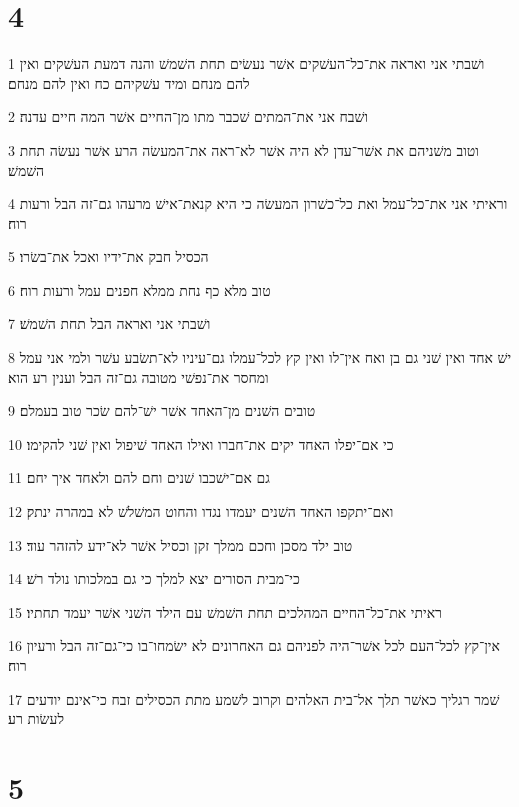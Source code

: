 \chapter{4}

\par 1 ושׁבתי אני ואראה את־כל־העשׁקים אשׁר נעשׂים תחת השׁמשׁ והנה דמעת העשׁקים ואין להם מנחם ומיד עשׁקיהם כח ואין להם מנחם׃
\par 2 ושׁבח אני את־המתים שׁכבר מתו מן־החיים אשׁר המה חיים עדנה׃
\par 3 וטוב משׁניהם את אשׁר־עדן לא היה אשׁר לא־ראה את־המעשׂה הרע אשׁר נעשׂה תחת השׁמשׁ׃
\par 4 וראיתי אני את־כל־עמל ואת כל־כשׁרון המעשׂה כי היא קנאת־אישׁ מרעהו גם־זה הבל ורעות רוח׃
\par 5 הכסיל חבק את־ידיו ואכל את־בשׂרו׃
\par 6 טוב מלא כף נחת ממלא חפנים עמל ורעות רוח׃
\par 7 ושׁבתי אני ואראה הבל תחת השׁמשׁ׃
\par 8 ישׁ אחד ואין שׁני גם בן ואח אין־לו ואין קץ לכל־עמלו גם־עיניו לא־תשׂבע עשׁר ולמי אני עמל ומחסר את־נפשׁי מטובה גם־זה הבל וענין רע הוא׃
\par 9 טובים השׁנים מן־האחד אשׁר ישׁ־להם שׂכר טוב בעמלם׃
\par 10 כי אם־יפלו האחד יקים את־חברו ואילו האחד שׁיפול ואין שׁני להקימו׃
\par 11 גם אם־ישׁכבו שׁנים וחם להם ולאחד איך יחם׃
\par 12 ואם־יתקפו האחד השׁנים יעמדו נגדו והחוט המשׁלשׁ לא במהרה ינתק׃
\par 13 טוב ילד מסכן וחכם ממלך זקן וכסיל אשׁר לא־ידע להזהר עוד׃
\par 14 כי־מבית הסורים יצא למלך כי גם במלכותו נולד רשׁ׃
\par 15 ראיתי את־כל־החיים המהלכים תחת השׁמשׁ עם הילד השׁני אשׁר יעמד תחתיו׃
\par 16 אין־קץ לכל־העם לכל אשׁר־היה לפניהם גם האחרונים לא ישׂמחו־בו כי־גם־זה הבל ורעיון רוח׃
\par 17 שׁמר רגליך כאשׁר תלך אל־בית האלהים וקרוב לשׁמע מתת הכסילים זבח כי־אינם יודעים לעשׂות רע׃

\chapter{5}

